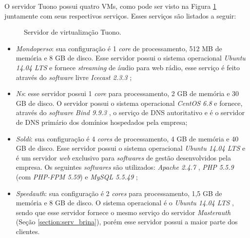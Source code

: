O servidor Tuono possui quatro \ac{VM}s, como pode ser visto na Figura \ref{fig:servidor_tuono} juntamente com seus respectivos serviços. 
Esses serviços são listados a seguir:

\begin{figure}[h!]
 \centering
 \caption{Servidor de virtualização Tuono.}
 \label{fig:servidor_tuono}
\end{figure}

\begin{itemize}
 \item \textit{Mondoperso}: sua configuração é 1 \textit{core} de processamento, 512 MB de memória e 8 GB de disco. Esse servidor possui o 
 sistema operacional \textit{Ubuntu 14.04 \ac{LTS}} \cite{ubuntu} e fornece \textit{streaming} de áudio para web rádio, esse serviço é feito
 através do \textit{software} livre \textit{Icecast 2.3.3} \cite{icecast};
 
 \item \textit{Ns}: esse servidor possui 1 \textit{core} para processamento, 2 GB de memória e 30 GB de disco. O servidor possui o sistema 
 operacional \textit{CentOS 6.8} \cite{centos} e fornece, através do \textit{software} \textit{Bind 9.9.3} \cite{bind}, o serviço de \ac{DNS} 
 autoritativo e é o servidor de \ac{DNS} primário dos domínios hospedados pela empresa;

 \item \textit{Soldi}: sua configuração é 4 \textit{cores} de processamento, 4 GB de memória e 40 GB de disco. Esse servidor possui o 
 sistema operacional \textit{Ubuntu 14.04 \ac{LTS}} \cite{ubuntu} e é um servidor \textit{web} exclusivo para \textit{softwares} de gestão 
 desenvolvidos pela empresa. Os seguintes \textit{softwares} são utilizados: \textit{Apache 2.4.7} \cite{apache}, \textit{\ac{PHP} 5.5.9} \cite{php} 
 (com \textit{PHP-FPM 5.59}) e \textit{MySQL 5.5.49} \cite{mysql};

 \item \textit{Speedauth}: sua configuração é 2 \textit{cores} para processamento, 1,5 GB de memória e 8 GB de disco. O sistema operacional é o 
 \textit{Ubuntu 14.04 \ac{LTS}} \cite{ubuntu}, sendo que esse servidor fornece o mesmo serviço do servidor \textit{Masterauth} 
 (Seção \ref{section:serv_brina}), porém esse servidor possui a maior parte dos clientes.
\end{itemize}

